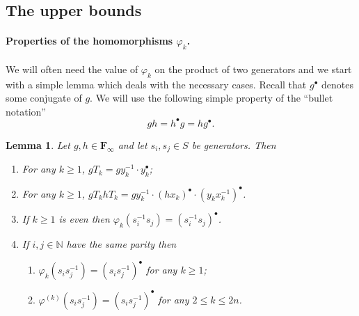 \documentclass[12pt,reqno,a4paper]{article}
\newtheorem{lemma}[theorem]{Lemma}
\theoremstyle{definition}
\theoremstyle{remark}
\numberwithin{equation}{section}
\numberwithin{figure}{section}
\newcommand{\B}[1]{{\mathbf #1}}
\begin{document}
\subsection{The upper bounds}

\paragraph{Properties of the homomorphisms $\varphi_k$.}
We will often need the value of $\varphi_k$ on the product of two generators
and we start with a simple lemma which deals with the necessary cases.
Recall that $g^{\bullet}$ denotes some conjugate of $g$. 
We will use
the following simple property of the ``bullet notation''
$$
gh = h^{\bullet}g = hg^{\bullet}. 
$$


\begin{lemma}\label{L:25}
Let $g,h\in \B F_{\infty}$ and let $s_i,s_j\in S$ be generators. Then
\begin{enumerate}[label=(\arabic*)]
\item \label{L:25:gT}
For any $k\geq 1$,
$gT_k = gy_k^{-1}\cdot y_k^{\bullet}$;
\item \label{L:25:gThT}
For any $k\geq 1$,
$gT_khT_k 
= gy_k^{-1}\cdot(hx_k)^{\bullet}\cdot(y_kx_k^{-1})^{\bullet}$.

\item \label{L:25:phi ss even}
If $k\geq 1$ is even then $\varphi_k(s_i^{-1}s_j)=(s_i^{-1}s_j)^{\bullet}$.
\item 
\label{L:25:phi ss odd}
If $i,j\in \mathbb N$ have the same parity then
\begin{enumerate}[label=(\alph*)]
\item \label{L:25:phi ss odd:lower}
$\varphi_k(s_is_j^{-1}) = (s_is_j^{-1})^{\bullet}$ for any $k\geq 1$;
\item \label{L:25:phi ss odd:upper}
$\varphi^{(k)}(s_is_j^{-1}) = (s_is_j^{-1})^{\bullet}$ for any
$2\leq k\leq 2n$.
\end{enumerate}
\end{enumerate}
\end{lemma}
\end{document}
